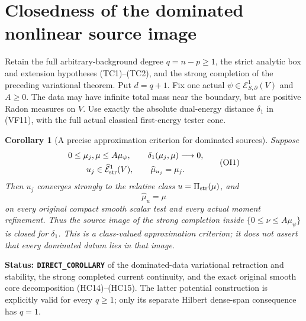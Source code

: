 \documentclass[11pt,a4paper]{article}
\numberwithin{equation}{section}
\newtheorem{corollary}[theorem]{Corollary}
\theoremstyle{definition}
\theoremstyle{remark}
\begin{document}


\section{Closedness of the dominated nonlinear source image}
\label{sec:r11-dominated-operator-image}

Retain the full arbitrary-background degree $q=n-p\geq1$,
the strict analytic box and extension hypotheses (TC1)--(TC2),
and the strong completion of the preceding variational theorem.
Put $d=q+1$.
Fix one actual $\psi\in\mathcal E^1_{S,\partial}(V)$ and
$A\geq0$.  The data may have infinite total mass near the
boundary, but are positive Radon measures on $V$.
Use exactly the absolute dual-energy distance $\delta_1$ in
(VF11), with the full actual classical first-energy tester cone.

\begin{corollary}[A precise approximation criterion for dominated sources]
\label{cor:r11-dominated-source-image-closed}
Suppose
\[
 \begin{gathered}
 0\leq\mu_j,\mu\leq A\mu_\psi,
       \qquad\delta_1(\mu_j,\mu)\longrightarrow0,\\
 u_j\in\widehat{\mathcal E}^1_{\rm str}(V),
                         \qquad\widehat\mu_{u_j}=\mu_j.
 \end{gathered}
 \tag{OI1}
\]
Then $u_j$ converges strongly to the relative class
$u=\Pi_{\rm str}(\mu)$, and
\[
                              \widehat\mu_u=\mu
 \tag{OI2}
\]
on every original compact smooth scalar test and every actual
moment refinement.  Thus the source image of the strong
completion inside $\{0\leq\nu\leq A\mu_\psi\}$ is closed
for $\delta_1$.  This is a class-valued approximation criterion;
it does not assert that every dominated datum lies in that image.
\end{corollary}

\noindent\textbf{Status: \texttt{DIRECT\_COROLLARY}} of
the dominated-data variational retraction and stability, the
strong completed current continuity, and the exact original
smooth core decomposition (HC14)--(HC15).  The latter potential
construction is explicitly valid for every $q\geq1$; only its
separate Hilbert dense-span consequence has $q=1$.
\end{document}
